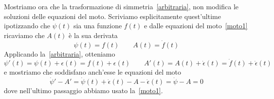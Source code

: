     Mostriamo ora che la trasformazione di simmetria~\eqref{arbitraria}, non modifica le soluzioni delle equazioni del moto. Scriviamo esplicitamente quest'ultime ipotizzando che $\psi(t)$ sia una funzione $f(t)$ e dalle equazioni del moto~\eqref{moto1} ricaviamo che $A(t)$ è la sua derivata
    \begin{equation*}
        \psi(t) = f(t) \qquad A(t) = \dot f(t)
    \end{equation*}
    Applicando la~\eqref{arbitraria}, otteniamo
    \begin{equation*}
        \psi'(t) = \psi(t) + \epsilon(t) = f(t) + \epsilon(t) \qquad A'(t) = A(t) + \dot \epsilon(t) = \dot f(t) + \dot \epsilon(t)
    \end{equation*}
    e mostriamo che soddisfano anch'esse le equazioni del moto
    \begin{equation*}
        \dot \psi'- A' = \dot \psi(t) + \dot \epsilon(t) - A - \dot \epsilon(t) = \dot \psi - A = 0
    \end{equation*}
    dove nell'ultimo passaggio abbiamo usato la~\eqref{moto1}.
    
